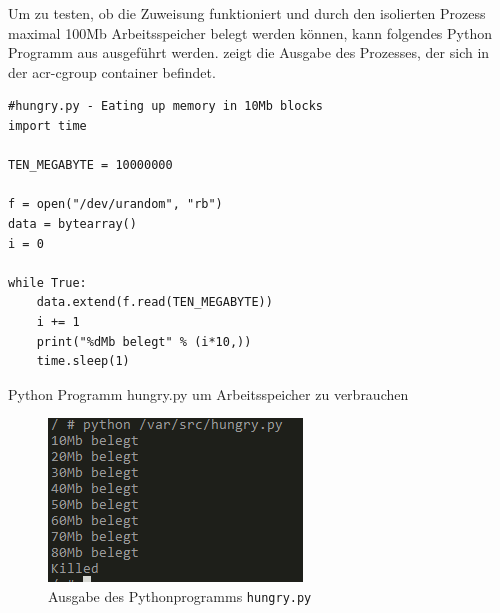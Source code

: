 Um zu testen, ob die Zuweisung funktioniert und durch den isolierten Prozess maximal \tildeawesome100Mb Arbeitsspeicher belegt werden können, kann folgendes Python Programm aus  ausgeführt werden.  zeigt die Ausgabe des Prozesses, der sich in der \gls{acr-cgroup} container befindet.

\begin{listing}[hp]
	\begin{verbatim}
#hungry.py - Eating up memory in 10Mb blocks
import time

TEN_MEGABYTE = 10000000

f = open("/dev/urandom", "rb")
data = bytearray()
i = 0

while True:
	data.extend(f.read(TEN_MEGABYTE))
	i += 1
	print("%dMb belegt" % (i*10,))
	time.sleep(1)
	\end{verbatim}
	\caption{Python Programm hungry.py um Arbeitsspeicher zu verbrauchen}
	\label{lst:hungry-py}
\end{listing}


\begin{figure}[hp]
	 \begin{center}
	 	\includegraphics[scale=1.3]{bilder/cgroup-container-killed.png}
	 	\caption{Ausgabe des Pythonprogramms \texttt{hungry.py}}
	 	\label{fig:cgroupKilled}
	 \end{center}
\end{figure}